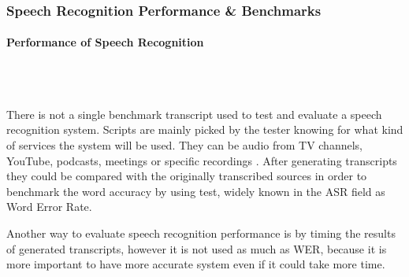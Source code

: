\documentclass{article}
\newcommand{\subsubsubsection}[1]{\paragraph{#1}\mbox{}\\}
\begin{document}
\subsubsection{Speech Recognition Performance \& Benchmarks}
\subsubsubsection{Performance of Speech Recognition}
\\
{\large
There is not a single benchmark transcript used to test and evaluate a speech recognition system. Scripts are mainly picked by the tester knowing for what kind of services the system will be used. They can be audio from TV channels, YouTube, podcasts, meetings or specific recordings \parencite{wertest}. After generating transcripts they could be compared with the originally transcribed sources in order to benchmark the word accuracy by using test, widely known in the ASR field as Word Error Rate.\par

Another way to evaluate speech recognition performance is by timing the results of generated transcripts, however it is not used as much as WER, because it is more important to have more accurate system even if it could take more time.\par
}
\end{document}
